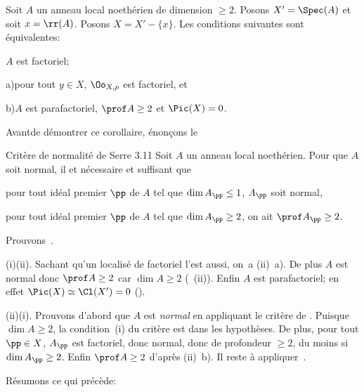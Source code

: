 \begin{corollaire} \label{XI.3.10}
Soit $A$ un anneau local noeth\'erien de dimension $\geq 2$. Posons $X'=\Spec(A)$ et soit $x = \rr(A)$. Posons $X=X'-\{x\}$. Les conditions suivantes sont \'equivalentes:
\begin{enumeratei}
\item
$A$ est factoriel;
\item
\textup{a)}\enspace pour tout $y\in X$, $\Oo_{X, p}$ est factoriel, et
\par\hspace*{6.3mm}\textup{b)}\enspace $A$ est parafactoriel, \ie $\prof A\geq 2$ et $\Pic(X)=0$.
\end{enumeratei}
\end{corollaire}

Avant\pageoriginale de d\'emontrer ce corollaire, \'enon\c cons le
\label{XI.3.11}
\begin{enonce*}{Crit\`ere de normalit\'e de Serre 3.11\sfootnotemark} Soit $A$ un anneau local noeth\'erien. Pour que $A$ soit normal, il et n\'ecessaire et suffisant que
\begin{enumeratei}
\item
pour tout id\'eal premier ${\pp}$ de $A$ tel que $\dim A_{{\pp}}\leq 1$, $A_{{\pp}}$ soit normal,
\item
pour tout id\'eal premier ${\pp}$ de $A$ tel que $\dim A_{{\pp}}\geq 2$, on ait $\prof A_{{\pp}}\geq 2$.
\end{enumeratei}
\end{enonce*}

Prouvons~.

(i)\ALORS (ii). Sachant qu'un localis\'e de factoriel l'est aussi, on~a (ii)~a). De plus $A$ est normal donc $\prof A\geq 2$ car $\dim A\geq 2$ (~(ii)). Enfin $A$ est parafactoriel; en effet $\Pic(X)\simeq\Cl(X')=0$ (\cf {}).

(ii)\ALORS (i). Prouvons d'abord que $A$ est \emph{normal} en appliquant le crit\`ere de . Puisque $\dim A\geq 2$, la condition~(i) du crit\`ere est dans les hypoth\`eses. De plus, pour tout ${\pp}\in X$, $A_{{\pp}}$ est factoriel, donc normal, donc de profondeur $\geq 2$, du moins si $\dim A_{{\pp}}\geq 2$. Enfin $\prof A\geq 2$ d'apr\`es (ii)~b). Il reste \`a appliquer~.

\smallskip
R\'esumons ce qui pr\'ec\`ede:

